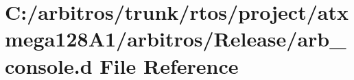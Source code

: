 \hypertarget{rtos_2project_2atxmega128_a1_2arbitros_2_release_2arb__console_8d}{\section{C\-:/arbitros/trunk/rtos/project/atxmega128\-A1/arbitros/\-Release/arb\-\_\-console.d File Reference}
\label{rtos_2project_2atxmega128_a1_2arbitros_2_release_2arb__console_8d}
}
